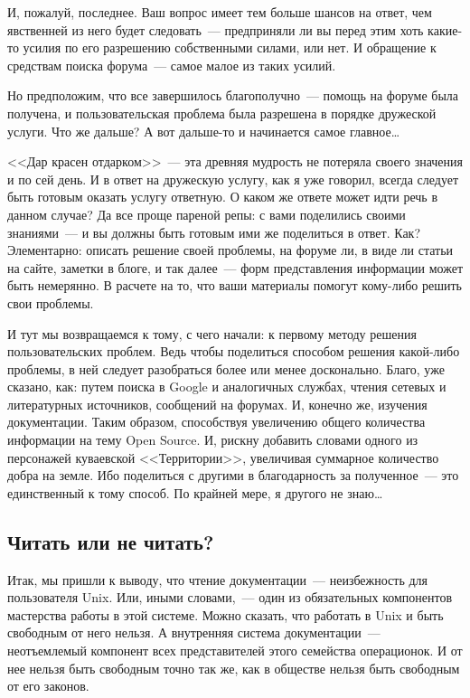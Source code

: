 И, пожалуй, последнее. Ваш вопрос имеет тем больше шансов на ответ, чем явственней из него будет следовать~--- предприняли ли вы перед этим хоть какие-то усилия по его разрешению собственными силами, или нет. И обращение к средствам поиска форума~--- самое малое из таких усилий.

Но предположим, что все завершилось благополучно~--- помощь на форуме была получена, и пользовательская проблема была разрешена в порядке дружеской услуги. Что же дальше? А вот дальше-то и начинается самое главное\dots

<<Дар красен отдарком>>~--- эта древняя мудрость не потеряла своего значения и по сей день. И в ответ на дружескую услугу, как я уже говорил, всегда следует быть готовым оказать услугу ответную. О каком же ответе может идти речь в данном случае? Да все проще пареной репы: с вами поделились своими знаниями~--- и вы должны быть готовым ими же поделиться в ответ. Как? Элементарно: описать решение своей проблемы, на форуме ли, в виде ли статьи на сайте, заметки в блоге, и так далее~--- форм представления информации может быть немерянно. В расчете на то, что ваши материалы помогут кому-либо решить свои проблемы.

И тут мы возвращаемся к тому, с чего начали: к первому методу решения пользовательских проблем. Ведь чтобы поделиться способом решения какой-либо проблемы, в ней следует разобраться более или менее досконально. Благо, уже сказано, как: путем поиска в Google и аналогичных службах, чтения сетевых и литературных источников, сообщений на форумах. И, конечно же, изучения документации. Таким образом, способствуя увеличению общего количества информации на тему Open Source. И, рискну добавить словами одного из персонажей куваевской <<Территории>>, увеличивая суммарное количество добра на земле. Ибо поделиться с другими в благодарность за полученное~--- это единственный к тому способ. По крайней мере, я другого не знаю\dots

\subsection{Читать или не читать?}
Итак, мы пришли к выводу, что чтение документации~--- неизбежность для пользователя Unix. Или, иными словами,~--- один из обязательных компонентов мастерства работы в этой системе. Можно сказать, что работать в Unix и быть свободным от него нельзя. А внутренняя система документации~--- неотъемлемый компонент всех представителей этого семейства операционок. И от нее нельзя быть свободным точно так же, как в обществе нельзя быть свободным от его законов.

